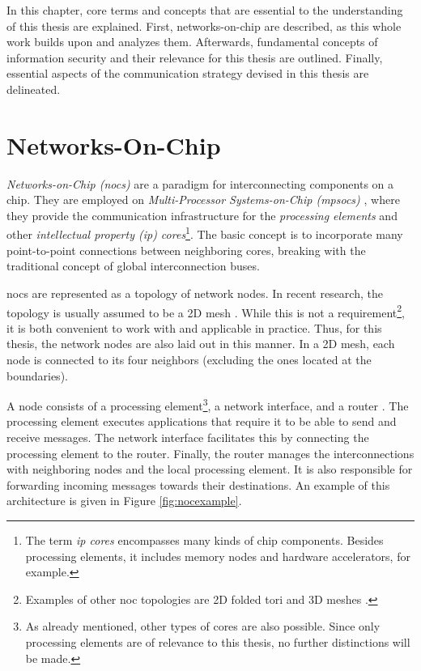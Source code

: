 In this chapter, core terms and concepts that are essential to the understanding of this thesis are explained. First, networks-on-chip are
described, as this whole work builds upon and analyzes them. Afterwards, fundamental concepts of information security and their relevance for this
thesis are outlined. Finally, essential aspects of the communication strategy devised in this thesis are delineated.

\section{Networks-On-Chip}\label{sec:networkonchipfun}
\textit{Networks-on-Chip (\glspl{noc})} are a paradigm for interconnecting components on a chip. They are employed on
\textit{Multi-Processor Systems-on-Chip (\glspl{mpsoc})} \cites(e.g.)(){ivanov05nocintroduction}{biswas15routerattack}{tatas16designingnocs}, where they
provide the communication infrastructure for the \textit{processing elements} and other \textit{intellectual property (\gls{ip}) cores}\footnote{The
term \textit{\gls{ip} cores} encompasses many kinds of chip components. Besides processing elements, it includes memory nodes and hardware
accelerators, for example.}. The basic concept is to incorporate many point-to-point connections between neighboring cores, breaking with the traditional
concept of global interconnection buses.

\glspl{noc} are represented as a topology of network nodes. In recent research, the topology is usually assumed to be a 2D mesh
\cites(e.g.)(){frey17hardenednoc}{kumar02networkonchip}{fernandes16nocrouting}{boraten16packetsecurity}. While this is not a
requirement\footnote{Examples of other \gls{noc} topologies are 2D folded tori and 3D meshes \cite[2]{feero07noc3d}.}, it is both convenient
to work with and applicable in practice. Thus, for this thesis, the network nodes are also laid out in this manner.
In a 2D mesh, each node is connected to its four neighbors (excluding the ones located at the boundaries).

A node consists of a processing element\footnote{As already mentioned, other types of cores are also possible. Since only processing elements are of
relevance to this thesis, no further distinctions will be made.}, a network interface, and a router \cite{dally01routepacketsnotwires}. The processing
element executes applications that require it to be able to send and receive messages. The network interface facilitates this by connecting the
processing element to the router. Finally, the router manages the interconnections with neighboring nodes and the local processing element. It is also
responsible for forwarding incoming messages towards their destinations. An example of this architecture is given in Figure \vref{fig:nocexample}.

